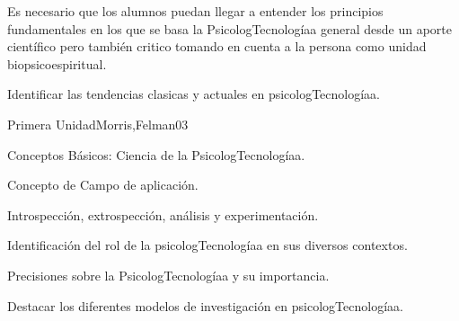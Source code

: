 \begin{syllabus}


\begin{justification}
Es necesario que los alumnos puedan llegar a entender los principios fundamentales en  los que se basa la PsicologTecnologíaa general desde un aporte científico pero también critico tomando en cuenta a la persona como unidad biopsicoespiritual.
\end{justification}

\begin{goals}
\item Identificar las tendencias clasicas y actuales en psicologTecnologíaa.
\end{goals}

\begin{outcomes}
\end{outcomes}

\begin{unit}{Primera Unidad}{Morris,Felman}{0}{3}
\begin{topics}
	\item Conceptos Básicos: Ciencia de la PsicologTecnologíaa.
	\item Concepto de Campo de aplicación.
	\item Introspección, extrospección, análisis y experimentación.
\end{topics}
\begin{unitgoals}
	\item Identificación del rol de la psicologTecnologíaa en sus diversos contextos.
	\item Precisiones sobre la PsicologTecnologíaa y su importancia.
	\item Destacar los diferentes modelos de investigación en psicologTecnologíaa.
\end{unitgoals}
\end{unit}


\end{syllabus}
